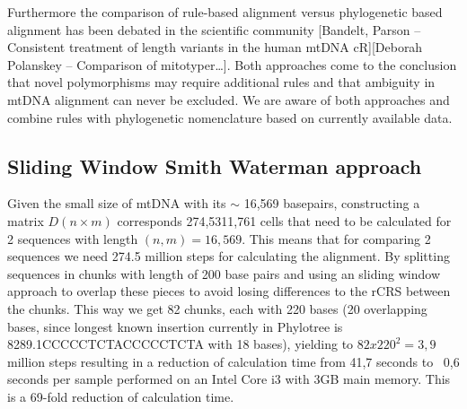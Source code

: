 Furthermore the comparison of rule-based alignment versus phylogenetic based alignment has been debated in the scientific community [Bandelt, Parson – Consistent treatment of length variants in the human mtDNA cR][Deborah Polanskey – Comparison of mitotyper…]. Both approaches come to the conclusion that novel polymorphisms may require additional rules and that ambiguity in mtDNA alignment can never be excluded. We are aware of both approaches and combine rules with phylogenetic nomenclature based on currently available data.
\subsection{Sliding Window Smith Waterman approach}
Given the small size of mtDNA with its $\sim$ 16,569 basepairs, constructing a matrix $D(n \times m)$ corresponds 274,5311,761 cells that need to be calculated for 2 sequences with length $(n,m) = 16,569$. This means that for comparing 2 sequences we need 274.5 million steps for calculating the alignment. By splitting sequences in chunks with length of 200 base pairs and using an sliding window approach to overlap these pieces to avoid losing differences to the rCRS between the chunks. This way we get 82 chunks, each with 220 bases (20 overlapping bases, since longest known insertion currently in Phylotree is 8289.1CCCCCTCTACCCCCTCTA with 18 bases), yielding to $82 x 220^2 = 3,9$ million steps resulting in a reduction of calculation time from 41,7 seconds to ~0,6 seconds per sample performed on an Intel Core i3 with 3GB main memory. This is a 69-fold reduction of calculation time. \\

